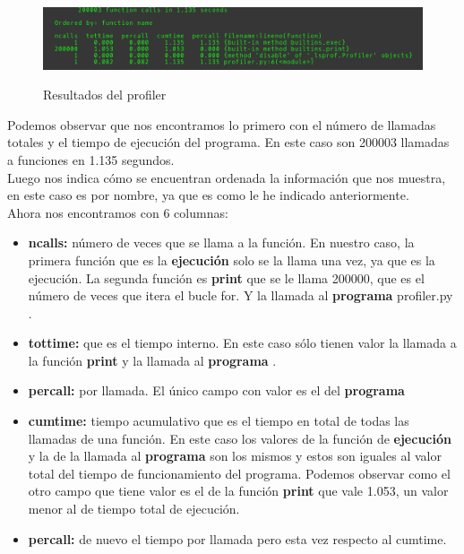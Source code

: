\begin{figure}[H] %
	\centering
	\includegraphics[scale=0.35]{figuras/figura30.png}  %
	\label{figura30}
	
	\caption{Resultados del profiler} 
\end{figure}

Podemos observar que nos encontramos lo primero con el número de llamadas totales y el tiempo de ejecución del programa. En este caso son 200003 llamadas a funciones en 1.135 segundos.\\
Luego nos indica cómo se encuentran ordenada la información que nos muestra, en este caso es por nombre, ya que es como le he indicado anteriormente.\\
Ahora nos encontramos con 6 columnas:
\begin{itemize}
	\item \textbf{ncalls: } número de veces que se llama a la función. En nuestro caso, la primera función que es la \textbf{ejecución} solo se la llama una vez, ya que es la ejecución. La segunda función es \textbf{print} que se le llama 200000, que es el número de veces que itera el bucle for. Y la llamada al \textbf{programa} profiler.py .
	\item \textbf{tottime: } que es el tiempo interno. En este caso sólo tienen valor la llamada a la función \textbf{print} y la llamada al \textbf{programa} .
	\item \textbf{percall: } por llamada. El único campo con valor es el del \textbf{programa}
	\item \textbf{cumtime: } tiempo acumulativo que es el tiempo en total de todas las llamadas de una función. En este caso los valores de la función de \textbf{ejecución} y la de la llamada al \textbf{programa} son los mismos y estos son iguales al valor total del tiempo de funcionamiento del programa. Podemos observar como el otro campo que tiene valor es el de la función \textbf{print}  que vale 1.053, un valor menor al de tiempo total de ejecución.
	\item \textbf{percall: } de nuevo el tiempo por llamada pero esta vez respecto al cumtime.
\end{itemize}

